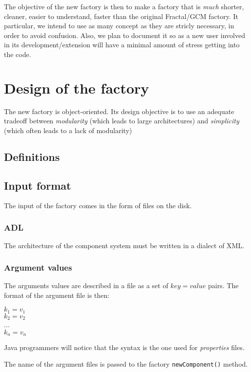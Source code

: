 \documentclass{article}
\newcommand{\code}[1]{\texttt{#1}}
\begin{document}
The objective of the new factory is then to make a factory that is {\em much} shorter, cleaner,
easier to understand, faster than the original Fractal/GCM factory. It particular, we intend to
use as many concept as they are stricly necessary, in order to avoid confusion. Also, we plan to
document it so as a new user involved in its development/extension will have a minimal amount of stress getting into the code.

\section{Design of the factory}
The new factory is object-oriented. Its design objective is to use an adequate tradeoff between {\em modularity} (which
leads to large architectures) and {\em simplicity} (which often leads to a lack of modularity)

\subsection{Definitions}


\subsection{Input format}

The input of the factory comes in the form of files on the disk.

\subsubsection{ADL}
The architecture of the component system must be written in a dialect of XML.

\subsubsection{Argument values}
The arguments values are described in a file as a set of $key=value$ pairs. The format
of the argument file is then:

\begin{center}
$k_1 = v_1$ \\
$k_2 = v_2$ \\
...  \\
$k_n = v_n$
\end{center}

Java programmers will notice that the syntax is the one used for \textit{properties} files.

The name of the argument files is passed to the factory \code{newComponent()} method.
\end{document}
